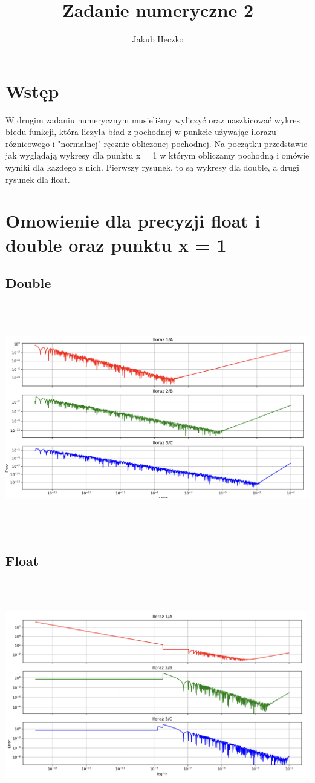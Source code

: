 \documentclass[12pt]{article}
\title{Zadanie numeryczne 2}
\author{Jakub Heczko}
\date{}
\begin{document}
\maketitle
\section{Wstęp}
W drugim zadaniu numerycznym musieliśmy wyliczyć oraz naszkicować wykres błedu funkcji, która liczyła bład z pochodnej w punkcie używając ilorazu różnicowego i "normalnej" ręcznie obliczonej pochodnej.
\newline
Na początku przedstawie jak wyglądają wykresy dla punktu x = 1 w którym obliczamy pochodną i omówie wyniki dla kazdego z nich. Pierwszy rysunek, to są wykresy dla double, a drugi rysunek dla float.
\section{Omowienie dla precyzji float i double oraz punktu x = 1}
\subsection*{Double}
\includegraphics[width=15cm,height=10cm, keepaspectratio]{wykres_double_1}
\subsection*{Float}
\includegraphics[width=15cm,height=10cm, keepaspectratio]{wykres_float_1}
\end{document}
